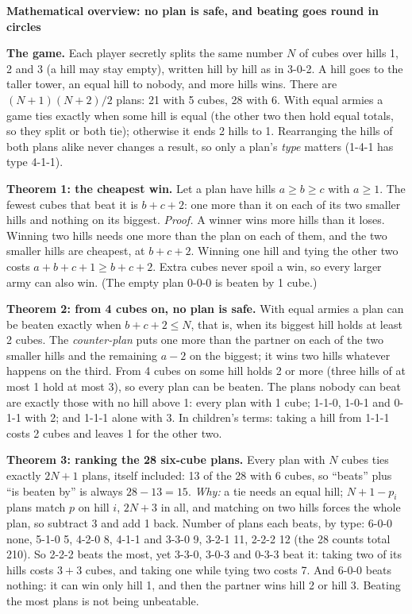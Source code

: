 \documentclass[11pt]{article}
\newcommand{\head}[1]{\par\textbf{\large #1}\par}
\begin{document}
\head{Mathematical overview: no plan is safe, and beating goes round in circles}
\textbf{The game.} Each player secretly splits the same number $N$ of cubes over hills 1, 2 and 3 (a hill may stay empty), written hill by hill as in 3-0-2. A hill goes to the taller tower, an equal hill to nobody, and more hills wins. There are $(N+1)(N+2)/2$ plans: 21 with 5 cubes, 28 with 6. With equal armies a game ties exactly when some hill is equal (the other two then hold equal totals, so they split or both tie); otherwise it ends 2 hills to 1. Rearranging the hills of both plans alike never changes a result, so only a plan's \emph{type} matters (1-4-1 has type 4-1-1).

\textbf{Theorem 1: the cheapest win.} Let a plan have hills $a\ge b\ge c$ with $a\ge1$. The fewest cubes that beat it is $b+c+2$: one more than it on each of its two smaller hills and nothing on its biggest. \emph{Proof.} A winner wins more hills than it loses. Winning two hills needs one more than the plan on each of them, and the two smaller hills are cheapest, at $b+c+2$. Winning one hill and tying the other two costs $a+b+c+1\ge b+c+2$. Extra cubes never spoil a win, so every larger army can also win. (The empty plan 0-0-0 is beaten by 1 cube.)

\textbf{Theorem 2: from 4 cubes on, no plan is safe.} With equal armies a plan can be beaten exactly when $b+c+2\le N$, that is, when its biggest hill holds at least 2 cubes. The \emph{counter-plan} puts one more than the partner on each of the two smaller hills and the remaining $a-2$ on the biggest; it wins two hills whatever happens on the third. From 4 cubes on some hill holds 2 or more (three hills of at most 1 hold at most 3), so every plan can be beaten. The plans nobody can beat are exactly those with no hill above 1: every plan with 1 cube; 1-1-0, 1-0-1 and 0-1-1 with 2; and 1-1-1 alone with 3. In children's terms: taking a hill from 1-1-1 costs 2 cubes and leaves 1 for the other two.

\textbf{Theorem 3: ranking the 28 six-cube plans.} Every plan with $N$ cubes ties exactly $2N+1$ plans, itself included: 13 of the 28 with 6 cubes, so ``beats'' plus ``is beaten by'' is always $28-13=15$. \emph{Why:} a tie needs an equal hill; $N+1-p_i$ plans match $p$ on hill $i$, $2N+3$ in all, and matching on two hills forces the whole plan, so subtract 3 and add 1 back. Number of plans each beats, by type: 6-0-0 none, 5-1-0 5, 4-2-0 8, 4-1-1 and 3-3-0 9, 3-2-1 11, 2-2-2 12 (the 28 counts total 210). So 2-2-2 beats the most, yet 3-3-0, 3-0-3 and 0-3-3 beat it: taking two of its hills costs $3+3$ cubes, and taking one while tying two costs 7. And 6-0-0 beats nothing: it can win only hill 1, and then the partner wins hill 2 or hill 3. Beating the most plans is not being unbeatable.
\end{document}
